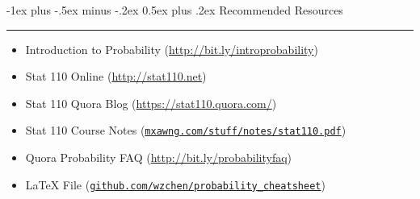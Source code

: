 \documentclass[10pt,landscape]{article}
\makeatletter
\theoremstyle{definition}
\renewcommand{\section}{\@startsection{section}{1}{0mm}%
                                {-1ex plus -.5ex minus -.2ex}%
                                {0.5ex plus .2ex}%
                                {\normalfont\large\bfseries}}
\makeatother
\begin{document}
\begin{multicols}{3}
\section{Recommended Resources} \smallskip \hrule height 2pt \smallskip

\begin{itemize} \itemsep -.25em
\item Introduction to Probability (\url{http://bit.ly/introprobability})
\item Stat 110 Online (\url{http://stat110.net})
\item Stat 110 Quora Blog (\url{https://stat110.quora.com/})
\item Stat 110 Course Notes (\texttt{\href{http://www.mxawng.com/stuff/notes/stat110.pdf}{mxawng.com/stuff/notes/stat110.pdf}})
\item Quora Probability FAQ (\url{http://bit.ly/probabilityfaq})
\item LaTeX File (\texttt{\href{https://github.com/wzchen/probability_cheatsheet}{github.com/wzchen/probability\_cheatsheet}})
\end{itemize}

\end{multicols}
\end{document}
